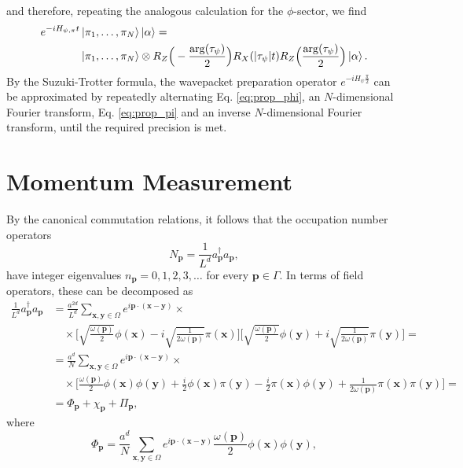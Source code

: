 \documentclass[a4paper,10pt]{report}
\begin{document}
and therefore, repeating the analogous calculation for the $\phi$-sector, we find
\begin{align}
e^{-iH_{\psi,\pi}t}&\ket{\pi_1,\dots,\pi_N}\ket{\alpha} = \nonumber\\
&\ket{\pi_1,\dots,\pi_N}\otimes R_Z\Big(-\frac{\arg(\tau_\psi)}{2}\Big)R_X(|\tau_\psi|t)R_Z\Big(\frac{\arg(\tau_\psi)}{2}\Big)\ket{\alpha}.
\label{eq:prop_pi}
\end{align}
By the Suzuki-Trotter formula, the wavepacket preparation operator $e^{-iH_\psi\frac{\pi}{2}}$ can be approximated by repeatedly alternating Eq. \eqref{eq:prop_phi}, an $N$-dimensional Fourier transform, Eq. \eqref{eq:prop_pi} and an inverse $N$-dimensional Fourier transform, until the required precision is met.

\section{Momentum Measurement}
By the canonical commutation relations, it follows that the occupation number operators
\begin{equation}
N_\mathbf{p} = \frac{1}{L^d}a^\dag_\mathbf{p}a_\mathbf{p},
\end{equation}
have integer eigenvalues $n_\mathbf{p}=0,1,2,3,\dots$ for every $\mathbf{p}\in\Gamma$. In terms of field operators, these can be decomposed as
\begin{align}
\frac{1}{L^d}a^\dag_\mathbf{p}a_\mathbf{p} &= \frac{a^{2d}}{L^d}\sum_{\mathbf{x},\mathbf{y}\in\Omega}e^{i\mathbf{p}\cdot(\mathbf{x}-\mathbf{y})}\times\nonumber\\
&\quad\times\bigg[\sqrt{\frac{\omega(\mathbf{p})}{2}}\phi(\mathbf{x}) - i\sqrt{\frac{1}{2\omega(\mathbf{p})}}\pi(\mathbf{x})\bigg]\bigg[\sqrt{\frac{\omega(\mathbf{p})}{2}}\phi(\mathbf{y}) + i\sqrt{\frac{1}{2\omega(\mathbf{p})}}\pi(\mathbf{y})\bigg] = \nonumber\\
&=\frac{a^d}{N}\sum_{\mathbf{x},\mathbf{y}\in\Omega}e^{i\mathbf{p}\cdot(\mathbf{x}-\mathbf{y})}\times\nonumber\\
&\quad\times\bigg[\frac{\omega(\mathbf{p})}{2}\phi(\mathbf{x})\phi(\mathbf{y}) + \frac{i}{2}\phi(\mathbf{x})\pi(\mathbf{y}) - \frac{i}{2}\pi(\mathbf{x})\phi(\mathbf{y}) + \frac{1}{2\omega(\mathbf{p})}\pi(\mathbf{x})\pi(\mathbf{y})\bigg] = \nonumber\\
&= \Phi_\mathbf{p} + \chi_\mathbf{p} + \Pi_\mathbf{p},
\end{align}
where
\begin{equation}
\Phi_\mathbf{p} = \frac{a^d}{N}\sum_{\mathbf{x},\mathbf{y}\in\Omega}e^{i\mathbf{p}\cdot(\mathbf{x}-\mathbf{y})}\frac{\omega(\mathbf{p})}{2}\phi(\mathbf{x})\phi(\mathbf{y}),
\label{eq:meas_phi}
\end{equation}
\end{document}
